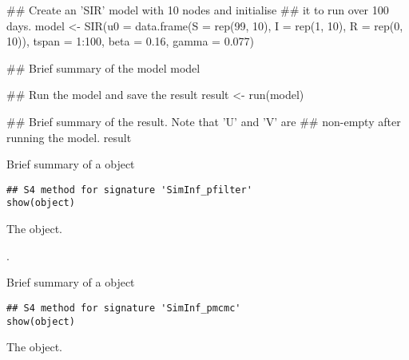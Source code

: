 \documentclass[letterpaper]{book}
\begin{document}
\begin{Examples}
\begin{ExampleCode}
## Create an 'SIR' model with 10 nodes and initialise
## it to run over 100 days.
model <- SIR(u0 = data.frame(S = rep(99, 10),
                             I = rep(1, 10),
                             R = rep(0, 10)),
             tspan = 1:100,
             beta = 0.16,
             gamma = 0.077)

## Brief summary of the model
model

## Run the model and save the result
result <- run(model)

## Brief summary of the result. Note that 'U' and 'V' are
## non-empty after running the model.
result
\end{ExampleCode}
\end{Examples}
%
\begin{Description}
Brief summary of a  object
\end{Description}
%
\begin{Usage}
\begin{verbatim}
## S4 method for signature 'SimInf_pfilter'
show(object)
\end{verbatim}
\end{Usage}
%
\begin{Arguments}
\begin{ldescription}
\item[\code{object}] The  object.
\end{ldescription}
\end{Arguments}
%
\begin{Value}
.
\end{Value}
%
\begin{Description}
Brief summary of a  object
\end{Description}
%
\begin{Usage}
\begin{verbatim}
## S4 method for signature 'SimInf_pmcmc'
show(object)
\end{verbatim}
\end{Usage}
%
\begin{Arguments}
\begin{ldescription}
\item[\code{object}] The  object.
\end{ldescription}
\end{Arguments}
\end{document}
